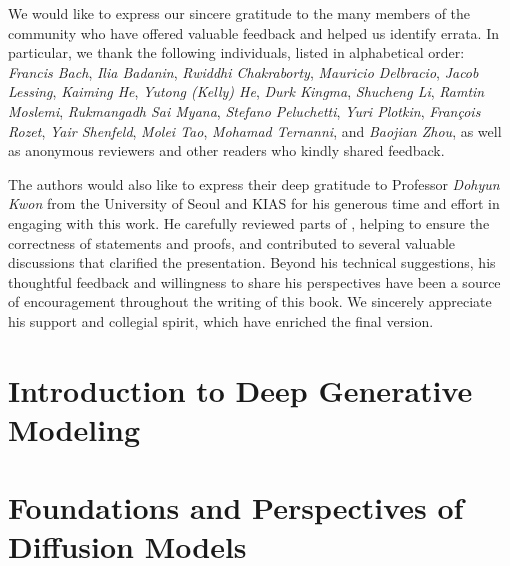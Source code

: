 \documentclass[examplefnt,biber]{nowfnt-arxiv} %
\newtheorem[M]{question}{\sffamily\bfseries Question}[section]
\begin{document}
\begin{acknowledgements}

We would like to express our sincere gratitude to the many members of the community who have offered valuable feedback and helped us identify errata. In particular, we thank the following individuals, listed in alphabetical order: \emph{Francis Bach}, \emph{Ilia Badanin}, \emph{Rwiddhi Chakraborty}, \emph{Mauricio Delbracio}, \emph{Jacob Lessing}, \emph{Kaiming He}, \emph{Yutong (Kelly) He}, \emph{Durk Kingma}, \emph{Shucheng Li}, \emph{Ramtin Moslemi}, \emph{Rukmangadh Sai Myana}, \emph{Stefano Peluchetti}, \emph{Yuri Plotkin}, \emph{François Rozet}, \emph{Yair Shenfeld}, \emph{Molei Tao}, \emph{Mohamad Ternanni}, and \emph{Baojian Zhou}, as well as anonymous reviewers and other readers who kindly shared feedback.

The authors would also like to express their deep gratitude to Professor \emph{Dohyun Kwon} from the University of Seoul and KIAS for his generous time and effort in engaging with this work. He carefully reviewed parts of , helping to ensure the correctness of statements and proofs, and contributed to several valuable discussions that clarified the presentation. Beyond his technical suggestions, his thoughtful feedback and willingness to share his perspectives have been a source of encouragement throughout the writing of this book. We sincerely appreciate his support and collegial spirit, which have enriched the final version.






\end{acknowledgements}



\part{Introduction to Deep Generative Modeling}

\part{Foundations and Perspectives of Diffusion Models}








\end{document}
